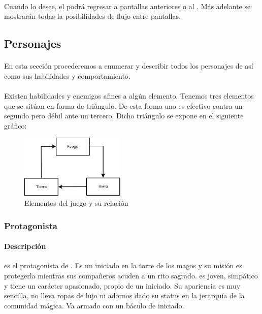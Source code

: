 \paragraph{}
Cuando lo desee, el \jugador podrá regresar a pantallas anteriores o al
\menu. Más adelante se mostrarán todas la posibilidades de flujo
entre pantallas.

\subsection{Personajes}
\label{sec:mec-personajes}

\paragraph{}
En esta sección procederemos a enumerar y describir todos los personajes
de \juego así como sus habilidades y comportamiento. 

\paragraph{}
Existen habilidades y enemigos afines a algún elemento. Tenemos tres elementos
que se sitúan en forma de triángulo. De esta forma uno es efectivo contra
un segundo pero débil ante un tercero. Dicho triángulo se expone en el siguiente
gráfico:

\begin{figure}[H]
    \centering
        \includegraphics[width=5cm]{img/elementos.png} 
    \caption{Elementos del juego y su relación}
    \label{img:elementos}
\end{figure}

\subsubsection{Protagonista}

\paragraph{Descripción}
\personaje es el protagonista de \juego. Es un iniciado en la torre de los
magos y su misión es protegerla mientras sus compañeros acuden a un rito sagrado.
\personaje es joven, simpático y tiene un carácter apasionado, propio de un
iniciado. Su apariencia es muy sencilla, no lleva ropas de lujo ni adornos dado
su status en la jerarquía de la comunidad mágica. Va armado con un báculo
de iniciado.

